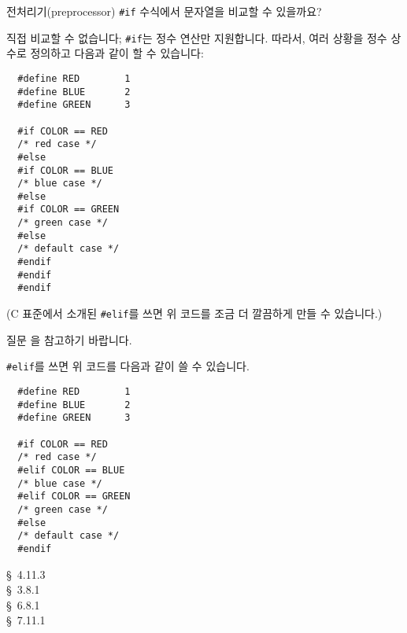 \begin{faq}
	전처리기(preprocessor) \verb+#if+ 수식에서 문자열을
	비교할 수 있을까요?

\A	직접 비교할 수 없습니다; \verb+#if+는 정수 연산만
	지원합니다.  따라서, 여러 상황을 정수 상수로 정의하고 다음과 같이
        할 수 있습니다:
\begin{verbatim}
  #define RED        1
  #define BLUE       2
  #define GREEN      3

  #if COLOR == RED
  /* red case */
  #else
  #if COLOR == BLUE
  /* blue case */
  #else
  #if COLOR == GREEN
  /* green case */
  #else
  /* default case */
  #endif
  #endif
  #endif
\end{verbatim}
	\noindent (C 표준에서 소개된 \verb+#elif+를 쓰면 위 코드를 조금 더 
        깔끔하게 만들 수 있습니다.)

	질문 을 참고하기 바랍니다.

\T
	\verb+#elif+를 쓰면 위 코드를 다음과 같이 쓸 수 있습니다.
\begin{verbatim}
  #define RED        1
  #define BLUE       2
  #define GREEN      3

  #if COLOR == RED
  /* red case */
  #elif COLOR == BLUE
  /* blue case */
  #elif COLOR == GREEN
  /* green case */
  #else
  /* default case */
  #endif
\end{verbatim}

\R	
	\cite{kr2} \S\ 4.11.3  \\
	\cite{ansi} \S\ 3.8.1 \\
	\cite{c89} \S\ 6.8.1 \\
	\cite{hs} \S\ 7.11.1 
\end{faq}
	
